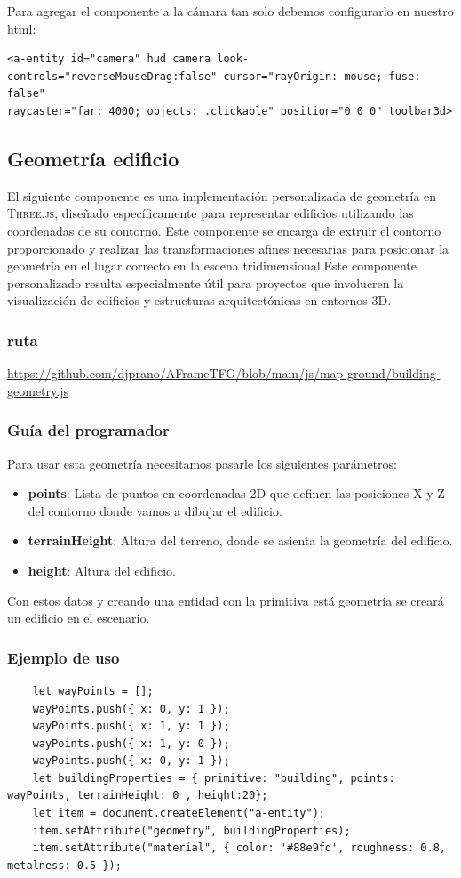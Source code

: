 \documentclass[a4paper, 11pt]{book}
\begin{document}
Para agregar el componente a la cámara tan solo debemos configurarlo en nuestro html:
\begin{verbatim}
<a-entity id="camera" hud camera look-controls="reverseMouseDrag:false" cursor="rayOrigin: mouse; fuse: false"
raycaster="far: 4000; objects: .clickable" position="0 0 0" toolbar3d>
\end{verbatim}
\subsection{Geometría edificio}
El siguiente componente es una implementación personalizada de geometría en \textsc{Three.js}, diseñado específicamente para representar edificios utilizando las coordenadas de su contorno. Este componente se encarga de extruir el contorno proporcionado y realizar las transformaciones afines necesarias para posicionar la geometría en el lugar correcto en la escena tridimensional.Este componente personalizado resulta especialmente útil para proyectos que involucren la visualización de edificios y estructuras arquitectónicas en entornos 3D.
\subsubsection{ruta}
{\scriptsize
	\url{https://github.com/djprano/AFrameTFG/blob/main/js/map-ground/building-geometry.js}
}
\subsubsection{Guía del programador}
Para usar esta geometría necesitamos pasarle los siguientes parámetros:
\begin{itemize}
	\item \textbf{points}: Lista de puntos en coordenadas 2D que definen las posiciones X y Z del contorno donde vamos a dibujar el edificio.
	\item \textbf{terrainHeight}: Altura del terreno, donde se asienta la geometría del edificio.
	\item \textbf{height}: Altura del edificio.
\end{itemize}
Con estos datos y creando una entidad con la primitiva está geometría se creará un edificio en el escenario.
\subsubsection{Ejemplo de uso}
\begin{verbatim}
	let wayPoints = [];
	wayPoints.push({ x: 0, y: 1 });
	wayPoints.push({ x: 1, y: 1 });
	wayPoints.push({ x: 1, y: 0 });
	wayPoints.push({ x: 0, y: 1 });
	let buildingProperties = { primitive: "building", points: wayPoints, terrainHeight: 0 , height:20};
	let item = document.createElement("a-entity");
	item.setAttribute("geometry", buildingProperties);
	item.setAttribute("material", { color: '#88e9fd', roughness: 0.8, metalness: 0.5 });
	
\end{verbatim}
\end{document}
